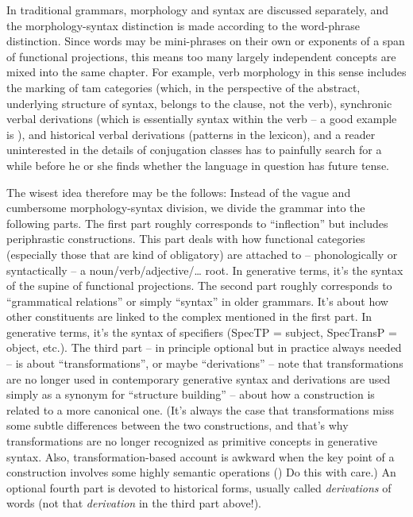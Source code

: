 \documentclass[UTF8, a4paper, oneside, scheme=plain]{ctexrep}
\newcommand*{\term}[1]{\emph{#1}}
\begin{document}
In traditional grammars,
morphology and syntax are discussed separately,
and the morphology-syntax distinction is made according to the word-phrase distinction.
Since words may be mini-phrases on their own or exponents of a span of functional projections,
this means too many largely independent concepts are mixed into the same chapter.
For example, verb morphology in this sense includes 
the marking of \acs{tam} categories 
(which, in the perspective of the abstract, underlying structure of syntax, 
belongs to the clause, not the verb),
synchronic verbal derivations 
(which is essentially syntax within the verb -- a good example is \citet{de2019negation}),
and historical verbal derivations 
(patterns in the lexicon),
and a reader uninterested in the details of conjugation classes 
has to painfully search for a while before he or she finds 
whether the language in question has future tense.

The wisest idea therefore may be the follows:
Instead of the vague and cumbersome morphology-syntax division,
we divide the grammar into the following parts.
The first part roughly corresponds to ``inflection'' 
but includes periphrastic constructions.
This part deals with how functional categories 
(especially those that are kind of obligatory) are attached to 
-- phonologically or syntactically -- a noun/verb/adjective/\dots{} root.
In generative terms, it's the syntax of the supine of functional projections.
The second part roughly corresponds to ``grammatical relations''
or simply ``syntax'' in older grammars.
It's about how other constituents are linked to the complex mentioned in the first part.
In generative terms, it's the syntax of specifiers (SpecTP = subject, SpecTransP = object, etc.).
The third part -- in principle optional but in practice always needed -- 
is about ``transformations'', or maybe ``derivations'' 
-- note that transformations are no longer used in contemporary generative syntax 
and derivations are used simply as a synonym for ``structure building'' -- 
about how a construction is related to a more canonical one.
(It's always the case that transformations miss some subtle differences between the two constructions,
and that's why transformations are no longer recognized as primitive concepts in generative syntax.
Also, transformation-based account is awkward 
when the key point of a construction involves some highly semantic operations 
()
Do this with care.)
An optional fourth part is devoted to historical forms,
usually called \term{derivations} of words 
(not that \term{derivation} in the third part above!).
\end{document}
